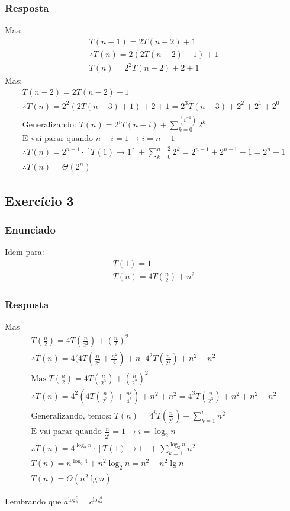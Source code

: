 \documentclass{article}
\begin{document}
\subsubsection{Resposta}
Mas:
\begin{align*}
    T(n-1) = 2T(n-2)+1 \\
    \therefore T(n) = 2(2T(n-2)+1) +1 \\
    T(n) = 2^2 T(n-2)+2+1
\end{align*}
Mas:
\begin{align*}
    T(n-2) = 2T(n-2)+1 \\
    \therefore T(n) = 2^2(2T(n-3)+1) + 2 + 1 = 2^3 T(n-3) + 2 ^2 + 2^1+2^0 \\
    \text{Generalizando: } T(n) = 2^i T(n-i) + \sum^{(i^{-1})}_{k=0}2^k \\
    \text{E vai parar quando } n -i = 1 \rightarrow \boxed{i = n-1} \\
    \therefore T(n) = 2^{n-1} \cdot [T(1) \rightarrow 1] + \sum^{n-2}_{k=0}2^k=2^{n-1} + 2^{n-1} -1 = 2^n -1 \\
    \therefore \boxed{T(n) = \Theta (2^n)}
\end{align*}
\subsection{Exercício 3}
\subsubsection{Enunciado}
Idem para:
\begin{align*}
    T(1) = 1 \\
    T(n) = 4T(\frac{n}{2}) + n^2
\end{align*}
\subsubsection{Resposta}
Mas
\begin{align*}
    T(\frac{n}{2}) = 4T(\frac{n}{2^2})+(\frac{n}{2})^2 \\
    \therefore T(n) = 4(4T(\frac{n}{2^2} + \frac{n^2}{4}) + n^ = 4^2 T(\frac{n}{2^2}) + n^2 + n^2 \\
    \text{Mas } T(\frac{n}{2})  = 4T(\frac{n}{2^3}) + (\frac{n}{2^2})^2 \\
    \therefore T(n) = 4^2(4T(\frac{n}{2^3}) + \frac{n^2}{4^2}) + n^2 + n^2 = 4^3T(\frac{n}{2^3}) + n^2 + n^2 + n^2 \\
    \text{Generalizando, temos: } T(n) = 4^i T(\frac{n}{2^i}) + \sum^i_{k=1}n^2 \\
    \text{E vai parar quando } \frac{n}{2^i} = 1 \rightarrow \boxed{i = \log_2 n} \\
    \therefore T(n) = 4^{\log_2 n} \cdot [T(1) \rightarrow 1] + \sum^{\log_2 n}_{k=1}n^2 \\
    T(n) = n^{\log_2 4} + n^2 \log_2 n = n^2 + n^2 \lg n \\
    \boxed{T(n) = \Theta (n^2 \lg n)}
\end{align*}

Lembrando que $ a^{\log_b^c} = c^{\log_b^a}$
\end{document}
